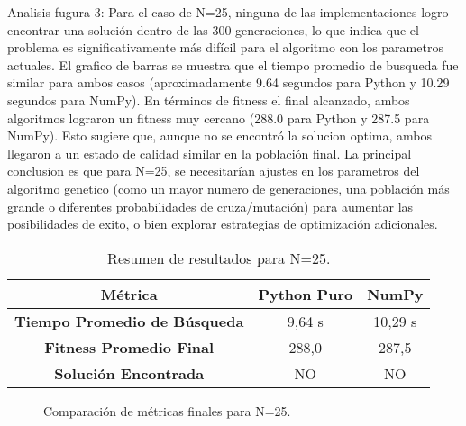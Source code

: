 \documentclass[journal]{IEEEtran}
\begin{document}
Analisis fugura 3:
Para el caso de N=25, ninguna de las implementaciones logro encontrar una solución dentro de las 300 generaciones, lo que indica que el problema es significativamente más difícil para el algoritmo con los parametros actuales. El grafico de barras se muestra que el tiempo promedio de busqueda fue similar para ambos casos (aproximadamente 9.64 segundos para Python y 10.29 segundos para NumPy). En términos de fitness el final alcanzado, ambos algoritmos lograron un fitness muy cercano (288.0 para Python y 287.5 para NumPy). Esto sugiere que, aunque no se encontró la solucion optima, ambos llegaron a un estado de calidad similar en la población final. La principal conclusion es que para N=25, se necesitarían ajustes en los parametros del algoritmo genetico (como un mayor numero de generaciones, una población más grande o diferentes probabilidades de cruza/mutación) para aumentar las posibilidades de exito, o bien explorar estrategias de optimización adicionales.


\begin{table}[h!]
\centering
\begin{tabular}{|c|c|c|}
\hline
\textbf{Métrica} & \textbf{Python Puro} & \textbf{NumPy} \\
\hline
\textbf{Tiempo Promedio de Búsqueda} & 9,64 s & 10,29 s \\
\hline
\textbf{Fitness Promedio Final} & 288,0 & 287,5 \\
\hline
\textbf{Solución Encontrada} & NO & NO \\
\hline
\end{tabular}
\caption{Resumen de resultados para N=25.}
\label{tab:final_resumen}
\end{table}

\begin{figure}[h!]
\centering
{}
\caption{Comparación de métricas finales para N=25.}
\label{fig:n25_comparacion}
\end{figure}
\end{document}
